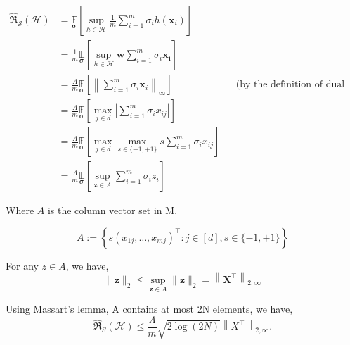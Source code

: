 \documentclass{article}
\begin{document}
\begin{align}
    \widehat{\Re}_{\mathcal{S}}(\mathcal{H})&=\underset{\boldsymbol{\sigma}}{\mathbb{E}}\left[\sup _{h \in \mathcal{H}} \frac{1}{m} \sum_{i=1}^{m} \sigma_{i} h\left(\mathbf{x}_{i}\right)\right] \\
    &=\frac{1}{m}
    \underset{\boldsymbol{\sigma}}{\mathbb{E}}
    \left[
        \sup _{h \in \mathcal{H}}  \mathbf{w} \sum_{i=1}^{m} \sigma_{i}  \mathbf{x_i}
    \right] \\
    &= \frac{\Lambda}{m} \underset{\boldsymbol{\sigma}}{\mathbb{E}}
    \left[
    \left\|\sum_{i=1}^{m} \sigma_{i} \mathbf{x}_{i}\right\|_{\infty}
    \right] && \text{(by the definition of dual norm)} \\
    &= \frac{\Lambda}{m} \underset{\boldsymbol{\sigma}}{\mathbb{E}}
    \left[
        \underset{j \in d}{\max}
        \left|
            \sum_{i=1}^{m} \sigma_{i} {x}_{ij}
        \right|
    \right]  \\
    &= \frac{\Lambda}{m} \underset{\boldsymbol{\sigma}}{\mathbb{E}}
    \left[
        \underset{j \in d}{\max}
        \underset{s \in \{-1, +1\}}{\max}
            s \sum_{i=1}^{m} \sigma_{i} {x}_{ij}
    \right]  \\
    &= \frac{\Lambda}{m} \underset{\boldsymbol{\sigma}}{\mathbb{E}}
    \left[
        \underset{\mathbf{z} \in A}{\sup}
            \sum_{i=1}^{m} \sigma_{i} z_i
    \right]  
\end{align}

Where $A$ is the column vector set in M.

\begin{equation}
    A := \left\{s\left(x_{1 j}, \ldots, x_{m j}\right)^{\top}: j \in[d], s \in\{-1,+1\}\right\}
\end{equation}

For any $z \in A$, we have,
\begin{equation}
    \|\mathbf{z}\|_{2} \leq \sup _{\mathbf{z} \in A}\|\mathbf{z}\|_{2}=\left\|\mathbf{X}^{\top}\right\|_{2, \infty}
\end{equation}

Using Massart's lemma, A contains at most 2N elements, we have,
\begin{equation}
    \widehat{\Re}_{S}(\mathcal{H}) \leq \frac{\Lambda}{m} \sqrt{2 \log (2 N)}\left\|X^{\top}\right\|_{2, \infty} .
\end{equation}
\end{document}
